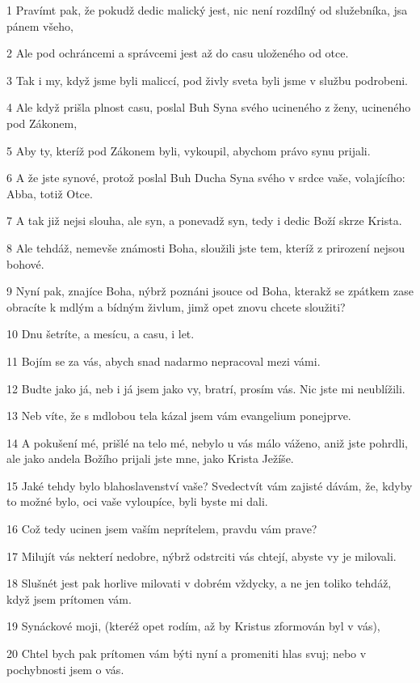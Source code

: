 \par 1 Pravímt pak, že pokudž dedic malický jest, nic není rozdílný od služebníka, jsa pánem všeho,
\par 2 Ale pod ochráncemi a správcemi jest až do casu uloženého od otce.
\par 3 Tak i my, když jsme byli maliccí, pod živly sveta byli jsme v službu podrobeni.
\par 4 Ale když prišla plnost casu, poslal Buh Syna svého ucineného z ženy, ucineného pod Zákonem,
\par 5 Aby ty, kteríž pod Zákonem byli, vykoupil, abychom právo synu prijali.
\par 6 A že jste synové, protož poslal Buh Ducha Syna svého v srdce vaše, volajícího: Abba, totiž Otce.
\par 7 A tak již nejsi slouha, ale syn, a ponevadž syn, tedy i dedic Boží skrze Krista.
\par 8 Ale tehdáž, nemevše známosti Boha, sloužili jste tem, kteríž z prirození nejsou bohové.
\par 9 Nyní pak, znajíce Boha, nýbrž poznáni jsouce od Boha, kterakž se zpátkem zase obracíte k mdlým a bídným živlum, jimž opet znovu chcete sloužiti?
\par 10 Dnu šetríte, a mesícu, a casu, i let.
\par 11 Bojím se za vás, abych snad nadarmo nepracoval mezi vámi.
\par 12 Budte jako já, neb i já jsem jako vy, bratrí, prosím vás. Nic jste mi neublížili.
\par 13 Neb víte, že s mdlobou tela kázal jsem vám evangelium ponejprve.
\par 14 A pokušení mé, prišlé na telo mé, nebylo u vás málo váženo, aniž jste pohrdli, ale jako andela Božího prijali jste mne, jako Krista Ježíše.
\par 15 Jaké tehdy bylo blahoslavenství vaše? Svedectvít vám zajisté dávám, že, kdyby to možné bylo, oci vaše vyloupíce, byli byste mi dali.
\par 16 Což tedy ucinen jsem vaším neprítelem, pravdu vám prave?
\par 17 Milujít vás nekterí nedobre, nýbrž odstrciti vás chtejí, abyste vy je milovali.
\par 18 Slušnét jest pak horlive milovati v dobrém vždycky, a ne jen toliko tehdáž, když jsem prítomen vám.
\par 19 Synáckové moji, (kteréž opet rodím, až by Kristus zformován byl v vás),
\par 20 Chtel bych pak prítomen vám býti nyní a promeniti hlas svuj; nebo v pochybnosti jsem o vás.
